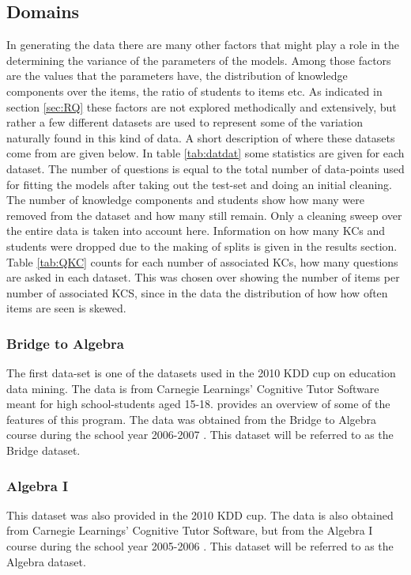 \documentclass{scrartcl}
\begin{document}
\subsection{Domains}
\label{sec:domain}
In generating the data there are many other factors that might play a role in the determining the variance of the parameters of the models. Among those factors are the values that the parameters have, the distribution of knowledge components over the items, the ratio of students to items etc. As indicated in section \ref{sec:RQ} these factors are not explored methodically and extensively, but rather a few different datasets are used to represent some of the variation naturally found in this kind of data. A short description of where these datasets come from are given below. In table \ref{tab:datdat} some statistics are given for each dataset. The number of questions is equal to the total number of data-points used for fitting the models after taking out the test-set and doing an initial cleaning. The number of knowledge components and students show how many were removed from the dataset and how many still remain. Only a cleaning sweep over the entire data is taken into account here. Information on how many KCs and students were dropped due to the making of splits is given in the results section. Table \ref{tab:QKC} counts for each number of associated KCs, how many questions are asked in each dataset. This was chosen over showing the number of items per number of associated KCS, since in the data the distribution of how how often items are seen is skewed. 

\subsubsection{Bridge to Algebra}
The first data-set is one of the datasets used in the 2010 KDD cup on education data mining. The data is from Carnegie Learnings' Cognitive Tutor Software meant for high school-students aged 15-18. \cite{ct} provides an overview of some of the features of this program. The data was obtained from the Bridge to Algebra course during the school year 2006-2007 \cite{bridge}. This dataset will be referred to as the Bridge dataset.

\subsubsection{Algebra I}
This dataset was also provided in the 2010 KDD cup. The data is also obtained from Carnegie Learnings' Cognitive Tutor Software, but from the Algebra I course during the school year 2005-2006 \cite{algebra}. This dataset will be referred to as the Algebra dataset.
\end{document}
